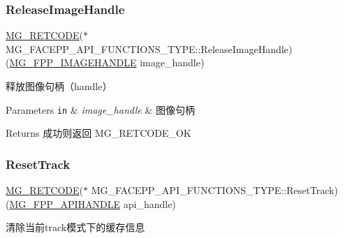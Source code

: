 \subsubsection{\texorpdfstring{Release\+Image\+Handle}{ReleaseImageHandle}}
{\footnotesize\ttfamily \hyperlink{_m_g___common_8h_a38fecb61b8c39592ddb51f75d4a5c5e7}{M\+G\+\_\+\+R\+E\+T\+C\+O\+DE}($\ast$ M\+G\+\_\+\+F\+A\+C\+E\+P\+P\+\_\+\+A\+P\+I\+\_\+\+F\+U\+N\+C\+T\+I\+O\+N\+S\+\_\+\+T\+Y\+P\+E\+::\+Release\+Image\+Handle) (\hyperlink{_m_g___facepp_8h_a3492210206745444514ed588709ea666}{M\+G\+\_\+\+F\+P\+P\+\_\+\+I\+M\+A\+G\+E\+H\+A\+N\+D\+LE} image\+\_\+handle)}



释放图像句柄（handle） 


\begin{DoxyParams}[1]{Parameters}
\mbox{\tt in}  & {\em image\+\_\+handle} & 图像句柄\\
\hline
\end{DoxyParams}
\begin{DoxyReturn}{Returns}
成功则返回 M\+G\+\_\+\+R\+E\+T\+C\+O\+D\+E\+\_\+\+OK 
\end{DoxyReturn}
\mbox{\label{struct_m_g___f_a_c_e_p_p___a_p_i___f_u_n_c_t_i_o_n_s___t_y_p_e_a53c43385e1f5bcc26e8125a382c2a167}} 
\subsubsection{\texorpdfstring{Reset\+Track}{ResetTrack}}
{\footnotesize\ttfamily \hyperlink{_m_g___common_8h_a38fecb61b8c39592ddb51f75d4a5c5e7}{M\+G\+\_\+\+R\+E\+T\+C\+O\+DE}($\ast$ M\+G\+\_\+\+F\+A\+C\+E\+P\+P\+\_\+\+A\+P\+I\+\_\+\+F\+U\+N\+C\+T\+I\+O\+N\+S\+\_\+\+T\+Y\+P\+E\+::\+Reset\+Track) (\hyperlink{_m_g___facepp_8h_ada15f635ef909e9aca52824dd580da40}{M\+G\+\_\+\+F\+P\+P\+\_\+\+A\+P\+I\+H\+A\+N\+D\+LE} api\+\_\+handle)}



清除当前track模式下的缓存信息 


